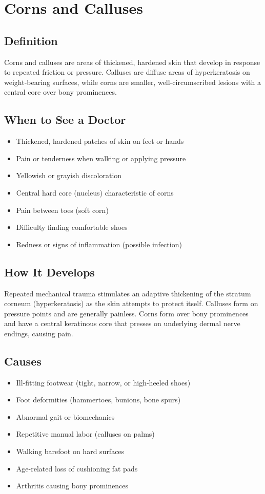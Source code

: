 \chapter{Corns and Calluses}

\section*{Definition}
Corns and calluses are areas of thickened, hardened skin that develop in response to repeated friction or pressure. Calluses are diffuse areas of hyperkeratosis on weight-bearing surfaces, while corns are smaller, well-circumscribed lesions with a central core over bony prominences.

\section*{When to See a Doctor}
\begin{itemize}
\item Thickened, hardened patches of skin on feet or hands
\item Pain or tenderness when walking or applying pressure
\item Yellowish or grayish discoloration
\item Central hard core (nucleus) characteristic of corns
\item Pain between toes (soft corn)
\item Difficulty finding comfortable shoes
\item Redness or signs of inflammation (possible infection)
\end{itemize}

\section*{How It Develops}
Repeated mechanical trauma stimulates an adaptive thickening of the stratum corneum (hyperkeratosis) as the skin attempts to protect itself. Calluses form on pressure points and are generally painless. Corns form over bony prominences and have a central keratinous core that presses on underlying dermal nerve endings, causing pain.

\section*{Causes}
\begin{itemize}
\item Ill-fitting footwear (tight, narrow, or high-heeled shoes)
\item Foot deformities (hammertoes, bunions, bone spurs)
\item Abnormal gait or biomechanics
\item Repetitive manual labor (calluses on palms)
\item Walking barefoot on hard surfaces
\item Age-related loss of cushioning fat pads
\item Arthritis causing bony prominences
\end{itemize}

